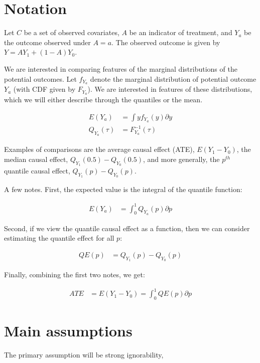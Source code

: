 \documentclass{article}\usepackage[]{graphicx}\usepackage[]{color}
\begin{document}
\section{Notation}

Let $C$ be a set of observed covariates, $A$ be an indicator of treatment, and $Y_a$ be the outcome observed under $A=a$. The observed outcome is given by $Y = AY_1 + (1-A)Y_0$. 

We are interested in comparing features of the marginal distributions of the potential outcomes. Let $f_{Y_a}$ denote the marginal distribution of potential outcome $Y_a$ (with CDF given by $F_{Y_a}$). We are interested in features of these distributions, which we will either describe through the quantiles or the mean. 

\begin{align*}
  E(Y_a) &= \int y f_{Y_a}(y) \partial y \\
  Q_{Y_a}(\tau) &= F^{-1}_{Y_a}(\tau)
\end{align*}

Examples of comparisons are the average causal effect (ATE), $E(Y_1-Y_0)$, the median causal effect, $Q_{Y_1}(0.5)-Q_{Y_0}(0.5)$, and more generally, the $p^{th}$ quantile causal effect, $Q_{Y_1}(p)-Q_{Y_0}(p)$.

A few notes. First, the expected value is the integral of the quantile function:

\begin{align*}
  E(Y_a) &= \int_0^1 Q_{Y_a}(p) \partial p
\end{align*}

\noindent Second, if we view the quantile causal effect as a function, then we can consider estimating the quantile effect for all $p$:

\begin{align*}
  QE(p) &= Q_{Y_1}(p)-Q_{Y_0}(p)
\end{align*}

\noindent Finally, combining the first two notes, we get:

\begin{align*}
  ATE &= E(Y_1-Y_0) = \int_0^1 QE(p) \partial p
\end{align*}

\section{Main assumptions}

The primary assumption will be strong ignorability, 
\end{document}
